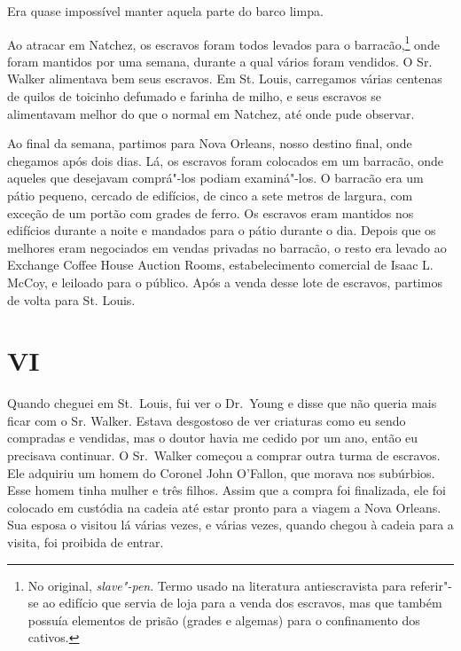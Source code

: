 Era quase impossível manter aquela parte do barco limpa.

Ao atracar em Natchez, os escravos foram todos levados para o
barracão,\footnote{No original, \emph{slave"-pen}. Termo usado na literatura
  antiescravista para referir"-se ao edifício que servia de loja para a
  venda dos escravos, mas que também possuía elementos de prisão (grades
  e algemas) para o confinamento dos cativos.} onde foram mantidos por
uma semana, durante a qual vários foram vendidos. O Sr. Walker
alimentava bem seus escravos. Em St. Louis, carregamos várias centenas
de quilos de toicinho defumado e farinha de milho, e seus escravos se
alimentavam melhor do que o normal em Natchez, até onde pude observar.

Ao final da semana, partimos para Nova Orleans, nosso destino final,
onde chegamos após dois dias. Lá, os escravos foram colocados em um
barracão, onde aqueles que desejavam comprá"-los podiam examiná"-los. O
barracão era um pátio pequeno, cercado de edifícios, de cinco a sete
metros de largura, com exceção de um portão com grades de ferro. Os
escravos eram mantidos nos edifícios durante a noite e mandados para o
pátio durante o dia. Depois que os melhores eram negociados em vendas
privadas no barracão, o resto era levado ao Exchange Coffee House
Auction Rooms, estabelecimento comercial de Isaac L. McCoy, e leiloado
para o público. Após a venda desse lote de escravos, partimos de volta
para St. Louis.

\chapter{VI}

Quando cheguei em St.~Louis, fui ver o Dr.~Young e disse que não queria
mais ficar com o Sr. Walker. Estava desgostoso de ver criaturas como eu
sendo compradas e vendidas, mas o doutor havia me cedido por um ano,
então eu precisava continuar. O Sr.~Walker começou a comprar outra turma
de escravos. Ele adquiriu um homem do Coronel John O'Fallon, que morava
nos subúrbios. Esse homem tinha mulher e três filhos. Assim que a compra
foi finalizada, ele foi colocado em custódia na cadeia até estar pronto
para a viagem a Nova Orleans. Sua esposa o visitou lá várias vezes, e
várias vezes, quando chegou à cadeia para a visita, foi proibida de
entrar.

